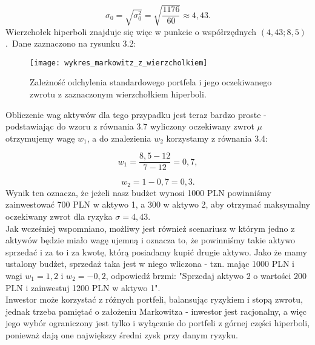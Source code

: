 \documentclass[magister]{dyplom}
\begin{document}
\begin{equation}
	\sigma_0 = \sqrt{\sigma_0^2} = \sqrt{\frac{1176}{60}} \approx 4,43.
\end{equation}
Wierzchołek hiperboli znajduje się więc w punkcie o współrzędnych $(4,43; 8,5)$. Dane zaznaczono na rysunku 3.2:\\
\begin{figure}[h]
	\centering
	\texttt{[image: wykres\_markowitz\_z\_wierzcholkiem]}
	\caption{Zależność odchylenia standardowego portfela i jego oczekiwanego zwrotu z zaznaczonym wierzchołkiem hiperboli.}
\end{figure}

Obliczenie wag aktywów dla tego przypadku jest teraz bardzo proste - podstawiając do wzoru z równania 3.7 wyliczony oczekiwany zwrot $\mu$ otrzymujemy wagę $w_1$, a do znalezienia $w_2$ korzystamy z równania 3.4:

\begin{equation}
	w_1 = \frac{8,5 - 12}{7 - 12} = 0,7,
\end{equation}

\begin{equation}
	w_2 = 1 - 0,7 = 0,3.
\end{equation}\newpage
Wynik ten oznacza, że jeżeli nasz budżet wynosi 1000 PLN powinniśmy zainwestować 700 PLN w aktywo 1, a 300 w aktywo 2, aby otrzymać maksymalny oczekiwany zwrot dla ryzyka $\sigma = 4,43$.\\

Jak wcześniej wspomniano, możliwy jest również scenariusz w którym jedno z aktywów będzie miało wagę ujemną i oznacza to, że powinniśmy takie aktywo sprzedać i za to i za kwotę, którą posiadamy kupić drugie aktywo. Jako że mamy ustalony budżet, sprzedaż taka jest w niego wliczona - tzn. mając 1000 PLN i wagi $w_1 = 1,2$ i $w_2 = -0,2$, odpowiedź brzmi: "Sprzedaj aktywo 2 o wartości 200 PLN i zainwestuj 1200 PLN w aktywo 1".\\

Inwestor może korzystać z różnych portfeli, balansując ryzykiem i stopą zwrotu, jednak trzeba pamiętać o założeniu Markowitza - inwestor jest racjonalny, a więc jego wybór ograniczony jest tylko i wyłącznie do portfeli z górnej części hiperboli, ponieważ dają one największy średni zysk przy danym ryzyku.
\end{document}
